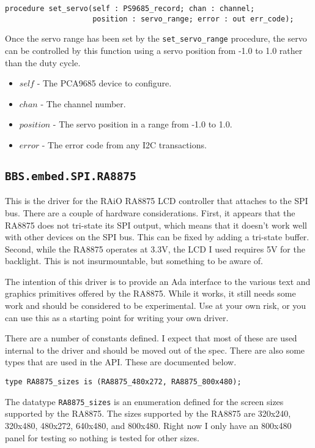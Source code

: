 \documentclass[10pt, openany]{book}
\newcommand{\indextype}[1]{\index[type]{#1}}
\newcommand{\indexfunc}[1]{\index[func]{#1}}
\newcommand{\package}[1]{\texttt{#1}}
\newcommand{\function}[1]{\texttt{#1}}
\newcommand{\datatype}[1]{\texttt{#1}}
\begin{document}
\begin{lstlisting}
procedure set_servo(self : PS9685_record; chan : channel;
                    position : servo_range; error : out err_code);
\end{lstlisting}
\indexfunc{set\_servo}
Once the servo range has been set by the \function{set\_servo\_range} procedure, the servo can be controlled by this function using a servo position from -1.0 to 1.0 rather than the duty cycle.
\begin{itemize}
  \item $self$ - The PCA9685 device to configure.
  \item $chan$ - The channel number.
  \item $position$ - The servo position in a range from -1.0 to 1.0.
  \item $error$ - The error code from any I2C transactions.
\end{itemize}

\subsection{\package{BBS.embed.SPI.RA8875}}
This is the driver for the RAiO RA8875 LCD controller that attaches to the SPI bus\cite{RA8875}.  There are a couple of hardware considerations.  First, it appears that the RA8875 does not tri-state its SPI output, which means that it doesn't work well with other devices on the SPI bus.  This can be fixed by adding a tri-state buffer.  Second, while the RA8875 operates at 3.3V, the LCD I used requires 5V for the backlight.  This is not insurmountable, but something to be aware of.

The intention of this driver is to provide an Ada interface to the various text and graphics primitives offered by the RA8875.  While it works, it still needs some work and should be considered to be experimental.  Use at your own risk, or you can use this as a starting point for writing your own driver.

There are a number of constants defined.  I expect that most of these are used internal to the driver and should be moved out of the spec.  There are also some types that are used in the API.  These are documented below.

\begin{lstlisting}
type RA8875_sizes is (RA8875_480x272, RA8875_800x480);
\end{lstlisting}
\indextype{RA8875\_sizes}
The datatype \datatype{RA8875\_sizes} is an enumeration defined for the screen sizes supported by the RA8875.  The sizes supported by the RA8875 are 320x240, 320x480, 480x272, 640x480, and 800x480.  Right now I only have an 800x480 panel for testing so nothing is tested for other sizes.
\end{document}
